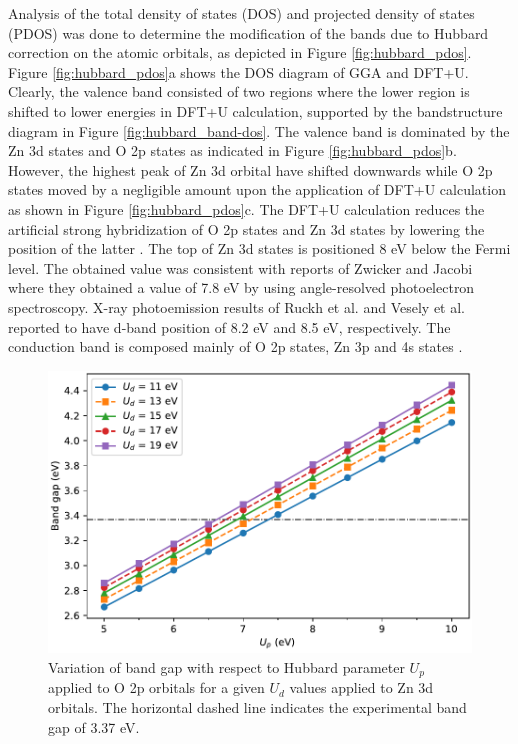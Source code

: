 Analysis of the total density of states (DOS) and projected density of states (PDOS) was done to determine the modification of the bands due to  Hubbard correction on the atomic orbitals, as depicted in Figure \ref{fig:hubbard_pdos}. Figure \ref{fig:hubbard_pdos}a shows the DOS diagram of GGA and DFT+U. Clearly, the valence band consisted of two regions where the lower region is shifted to lower energies in DFT+U calculation, supported  by the bandstructure diagram in Figure \ref{fig:hubbard_band-dos}. The valence band is dominated by the Zn 3d states and O 2p states as indicated in Figure  \ref{fig:hubbard_pdos}b. However, the highest peak of Zn 3d orbital have shifted downwards while O 2p states moved by a negligible amount upon the application of DFT+U calculation as shown in Figure \ref{fig:hubbard_pdos}c. The DFT+U calculation reduces the artificial strong hybridization of O 2p states and Zn 3d states by lowering the position of the latter \citep{Goh2017}. The top of Zn 3d states is positioned 8 eV below the Fermi level. The obtained value was consistent with reports of Zwicker and Jacobi \citep{Zwicker1985} where they obtained a value of 7.8 eV by using angle-resolved photoelectron spectroscopy. X-ray photoemission results of Ruckh et al. \citep{Ruckh1994} and Vesely et al. \citep{Vesely1972} reported to have d-band position of 8.2 eV and 8.5 eV, respectively. The conduction band is composed mainly of O 2p states, Zn 3p and 4s states \citep{Harun2020}.



\begin{figure}[htbp!]
	\centering
	\includegraphics[width=0.7\linewidth]{"images/rnd/hubbard_val"}
	\caption[Variation of band gap with respect to Hubbard parameter $U_p$ applied to O 2p orbitals for a given $U_d$ applied to Zn 3d orbitals. ]{Variation of band gap with respect to Hubbard parameter $U_p$ applied to O 2p orbitals for a given $U_d$ values applied to Zn 3d orbitals. The horizontal dashed line indicates the experimental band gap of 3.37 eV.}
	\label{fig:hubbard_val}
\end{figure}


